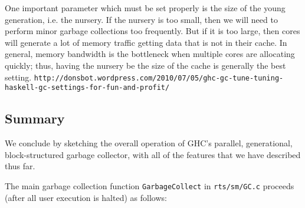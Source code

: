 One important parameter which must be set properly is the size of the
young generation, i.e. the nursery.  If the nursery is too small, then
we will need to perform minor garbage collections too frequently.  But
if it is too large, then cores will generate a lot of memory traffic
getting data that is not in their cache.  In general, memory bandwidth
is the bottleneck when multiple cores are allocating quickly; thus,
having the nursery be the size of the cache is generally the best setting.
 \verb|http://donsbot.wordpress.com/2010/07/05/ghc-gc-tune-tuning-haskell-gc-settings-for-fun-and-profit/|




\subsection{Summary}


We conclude by sketching the overall operation of GHC's parallel,
generational, block-structured garbage collector, with all of the
features that we have described thus far.

The main garbage collection function
\verb|GarbageCollect| in \verb|rts/sm/GC.c| proceeds (after all user
execution is halted) as follows:

